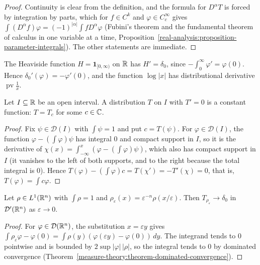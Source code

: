 \begin{proof}
Continuity is clear from the definition, and the formula for $D^\alpha T$ is forced by integration by parts, which for $f \in C^k$ and $\varphi \in C_c^\infty$ gives
$\int (D^\alpha f)\varphi = (-1)^{|\alpha|}\int f D^\alpha\varphi$ (Fubini's theorem and the fundamental theorem of calculus in one variable at a time,
Proposition~\ref{real-analysis:proposition-parameter-integrals}). The other statements are immediate.
\end{proof}

\begin{example}\label{distributions:example-heaviside}
The Heaviside function $H = \mathbf{1}_{[0,\infty)}$ on $\mathbb{R}$ has $H' = \delta_0$, since $-\int_0^\infty\varphi' = \varphi(0)$. Hence $\delta_0' (\varphi) = -\varphi'(0)$, and the function $\log|x|$ has
distributional derivative $\operatorname{pv}\frac1x$.
\end{example}

\begin{proposition}\label{distributions:proposition-zero-derivative}
Let $I \subseteq \mathbb{R}$ be an open interval. A distribution $T$ on $I$ with $T' = 0$ is a constant function: $T = T_c$ for some $c \in \mathbb{C}$.
\end{proposition}

\begin{proof}
Fix $\psi \in \mathcal{D}(I)$ with $\int\psi = 1$ and put $c = T(\psi)$. For $\varphi \in \mathcal{D}(I)$, the function $\varphi - (\int\varphi)\psi$ has integral $0$ and compact support in $I$, so it is the derivative of
$\chi(x) = \int_{-\infty}^x(\varphi - (\int\varphi)\psi)$, which also has compact support in $I$ (it vanishes to the left of both supports, and to the right because the total integral is $0$). Hence
$T(\varphi) - (\int\varphi)c = T(\chi') = -T'(\chi) = 0$, that is, $T(\varphi) = \int c\varphi$.
\end{proof}

\begin{proposition}\label{distributions:proposition-approximate-identity}
Let $\rho \in L^1(\mathbb{R}^n)$ with $\int\rho = 1$ and $\rho_\varepsilon(x) = \varepsilon^{-n}\rho(x/\varepsilon)$. Then $T_{\rho_\varepsilon} \to \delta_0$ in $\mathcal{D}'(\mathbb{R}^n)$ as $\varepsilon \to 0$.
\end{proposition}

\begin{proof}
For $\varphi \in \mathcal{D}(\mathbb{R}^n)$, the substitution $x = \varepsilon y$ gives $\int\rho_\varepsilon\varphi - \varphi(0) = \int\rho(y)(\varphi(\varepsilon y) - \varphi(0))\,dy$. The integrand tends to $0$ pointwise and is bounded by
$2\sup|\varphi|\,|\rho|$, so the integral tends to $0$ by dominated convergence (Theorem~\ref{measure-theory:theorem-dominated-convergence}).
\end{proof}

